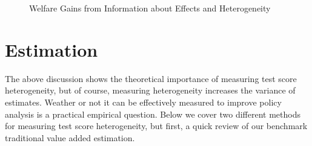 \documentclass[12pt]{article}
\theoremstyle{definition}
\theoremstyle{definition}
\theoremstyle{definition}
\theoremstyle{definition}
\begin{document}
\begin{figure}[H]
\begin{tikzpicture}
	\end{tikzpicture}
	
	\caption{Welfare Gains from Information about Effects and Heterogeneity}
	\label{fig:theory}
\end{figure}











\section{Estimation}
\label{estimation_section}

    The above discussion shows the theoretical importance of measuring test score heterogeneity, but of course, measuring heterogeneity increases the variance of estimates. Weather or not it can be effectively measured to improve policy analysis is a practical empirical question. Below we cover two different methods for measuring test score heterogeneity, but first, a quick review of our benchmark traditional value added estimation. 
\end{document}
